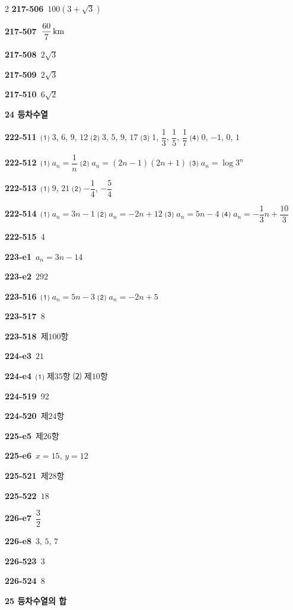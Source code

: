 \documentclass[10pt,a4paper]{article}
\begin{document}
\begin{multicols}{2}
\noindent\textbf{217-506}\ $100(3+\sqrt{3})$\par
\noindent\textbf{217-507}\ $\dfrac{60}{7}\mkern3mu \mathrm{km}$\par
\noindent\textbf{217-508}\ $2\sqrt{3}$\par
\noindent\textbf{217-509}\ $2\sqrt{3}$\par
\noindent\textbf{217-510}\ $6\sqrt{2}$\par
\noindent\textbf{24 등차수열}\par\smallskip
\noindent\textbf{222-511}\ ⑴ $3$, $6$, $9$, $12$ ⑵ $3$, $5$, $9$, $17$ ⑶ $1$, $\dfrac{1}{3}$, $\dfrac{1}{5}$, $\dfrac{1}{7}$ ⑷ $0$, $-1$, $0$, $1$\par
\noindent\textbf{222-512}\ ⑴ $a_n=\dfrac{1}{n}$ ⑵ $a_n=(2n-1)(2n+1)$ ⑶ $a_n=\log 3^n$\par
\noindent\textbf{222-513}\ ⑴ $9$, $21$ ⑵ $-\dfrac{1}{4}$, $-\dfrac{5}{4}$\par
\noindent\textbf{222-514}\ ⑴ $a_n=3n-1$ ⑵ $a_n=-2n+12$ ⑶ $a_n=5n-4$ ⑷ $a_n=-\dfrac{1}{3}n+\dfrac{10}{3}$\par
\noindent\textbf{222-515}\ $4$\par
\noindent\textbf{223-e1}\ $a_n=3n-14$\par
\noindent\textbf{223-e2}\ $292$\par
\noindent\textbf{223-516}\ ⑴ $a_n=5n-3$ ⑵ $a_n=-2n+5$\par
\noindent\textbf{223-517}\ $8$\par
\noindent\textbf{223-518}\ 제$100$항\par
\noindent\textbf{224-e3}\ $21$\par
\noindent\textbf{224-e4}\ ⑴ 제$35$항 ⑵ 제$10$항\par
\noindent\textbf{224-519}\ $92$\par
\noindent\textbf{224-520}\ 제$24$항\par
\noindent\textbf{225-e5}\ 제$26$항\par
\noindent\textbf{225-e6}\ $x=15$, $y=12$\par
\noindent\textbf{225-521}\ 제$28$항\par
\noindent\textbf{225-522}\ $18$\par
\noindent\textbf{226-e7}\ $\dfrac{3}{2}$\par
\noindent\textbf{226-e8}\ $3$, $5$, $7$\par
\noindent\textbf{226-523}\ $3$\par
\noindent\textbf{226-524}\ $8$\par
\noindent\textbf{25 등차수열의 합}\par\smallskip

\end{multicols}
\end{document}
